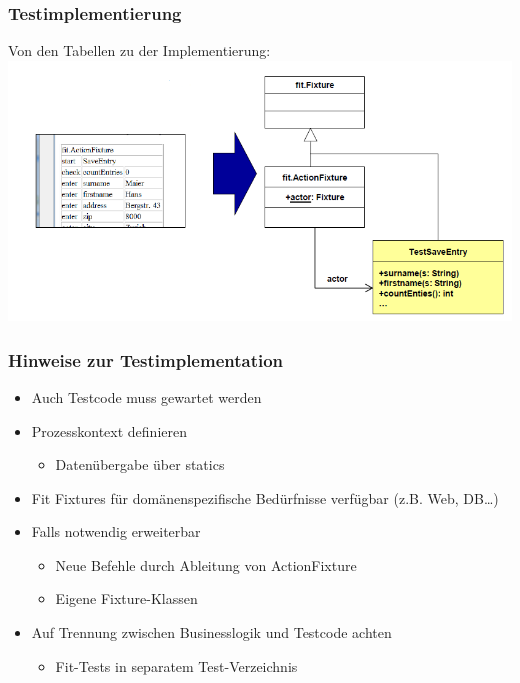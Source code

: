 \documentclass[a4paper,10pt]{article}
\begin{document}
\subsubsection{Testimplementierung}
Von den Tabellen zu der Implementierung:\\
\includegraphics[scale=0.7]{FIT_TestImplementierung.png}

\subsubsection{Hinweise zur Testimplementation}
\begin{itemize}
\item Auch Testcode muss gewartet werden
\item Prozesskontext definieren
	\begin{itemize}
		\item Daten\"ubergabe \"uber statics 
	\end{itemize}
\item Fit Fixtures f\"ur dom\"anenspezifische Bed\"urfnisse verf\"ugbar (z.B. Web, DB…)
\item Falls notwendig erweiterbar
	\begin{itemize}
		\item Neue Befehle durch Ableitung von ActionFixture
		\item Eigene Fixture-Klassen
	\end{itemize}
\item Auf Trennung zwischen Businesslogik und Testcode achten
	\begin{itemize}
		\item Fit-Tests in separatem Test-Verzeichnis
	\end{itemize}
\end{itemize}
\end{document}
